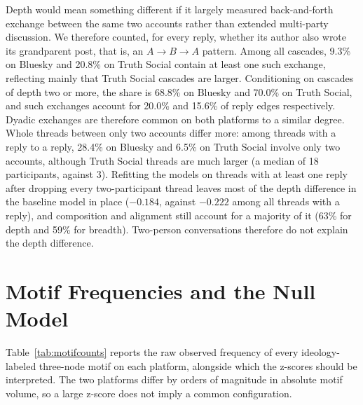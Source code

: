 \documentclass[letterpaper]{article} %
\newcommand{\rev}[1]{{\color{blue}#1}}
\begin{document}
\rev{Depth would mean something different if it largely measured back-and-forth exchange between the same two accounts rather than extended multi-party discussion. We therefore counted, for every reply, whether its author also wrote its grandparent post, that is, an $A \rightarrow B \rightarrow A$ pattern. Among all cascades, 9.3\% on Bluesky and 20.8\% on Truth Social contain at least one such exchange, reflecting mainly that Truth Social cascades are larger. Conditioning on cascades of depth two or more, the share is 68.8\% on Bluesky and 70.0\% on Truth Social, and such exchanges account for 20.0\% and 15.6\% of reply edges respectively. Dyadic exchanges are therefore common on both platforms to a similar degree. Whole threads between only two accounts differ more: among threads with a reply to a reply, 28.4\% on Bluesky and 6.5\% on Truth Social involve only two accounts, although Truth Social threads are much larger (a median of 18 participants, against 3). Refitting the models on threads with at least one reply after dropping every two-participant thread leaves most of the depth difference in the baseline model in place ($-0.184$, against $-0.222$ among all threads with a reply), and composition and alignment still account for a majority of it (63\% for depth and 59\% for breadth). Two-person conversations therefore do not explain the depth difference.}

\section{\rev{Motif Frequencies and the Null Model}}

\rev{Table~\ref{tab:motifcounts} reports the raw observed frequency of every ideology-labeled three-node motif on each platform, alongside which the z-scores should be interpreted. The two platforms differ by orders of magnitude in absolute motif volume, so a large z-score does not imply a common configuration.}
\end{document}
